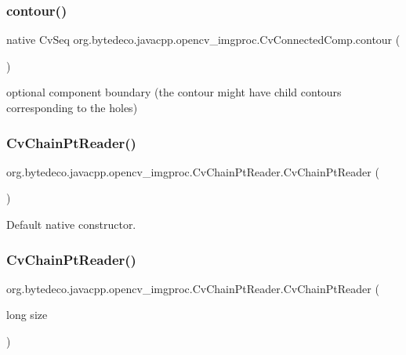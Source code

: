 \subsubsection{\texorpdfstring{contour()}{contour()}}
{\footnotesize\ttfamily native Cv\+Seq org.\+bytedeco.\+javacpp.\+opencv\+\_\+imgproc.\+Cv\+Connected\+Comp.\+contour (\begin{DoxyParamCaption}{ }\end{DoxyParamCaption})}

optional component boundary (the contour might have child contours corresponding to the holes) \mbox{\label{group__imgproc_ga3e9f307240cd0a45983beb3174b76f42}} 
\subsubsection{\texorpdfstring{Cv\+Chain\+Pt\+Reader()}{CvChainPtReader()}\hspace{0.1cm}{\footnotesize\ttfamily [1/3]}}
{\footnotesize\ttfamily org.\+bytedeco.\+javacpp.\+opencv\+\_\+imgproc.\+Cv\+Chain\+Pt\+Reader.\+Cv\+Chain\+Pt\+Reader (\begin{DoxyParamCaption}{ }\end{DoxyParamCaption})\hspace{0.3cm}{\ttfamily [inline]}}

Default native constructor. \mbox{\label{group__imgproc_ga3a01300ad23665f62104a167770a059c}} 
\subsubsection{\texorpdfstring{Cv\+Chain\+Pt\+Reader()}{CvChainPtReader()}\hspace{0.1cm}{\footnotesize\ttfamily [2/3]}}
{\footnotesize\ttfamily org.\+bytedeco.\+javacpp.\+opencv\+\_\+imgproc.\+Cv\+Chain\+Pt\+Reader.\+Cv\+Chain\+Pt\+Reader (\begin{DoxyParamCaption}\item[{long}]{size }\end{DoxyParamCaption})\hspace{0.3cm}{\ttfamily [inline]}}

